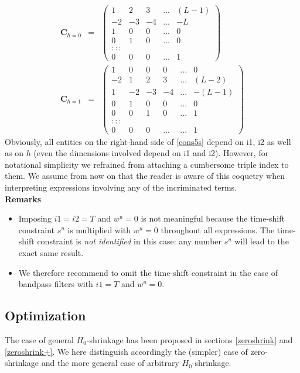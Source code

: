 \documentclass[11pt]{article}
\begin{document}
\begin{eqnarray*}%
\mathbf{C}_{h=0}&=&\left(\begin{array}{ccccc}
1&2&3&...&(L-1)\\
-2&-3&-4&...&-L\\
1&0&0&...&0\\
0&1&0&...&0\\
:::\\
0&0&0&...&1
\end{array}\right)\nonumber\\
\mathbf{C}_{h=1}&=&\left(\begin{array}{cccccc}
1&0&0&0&...&0\\
-2&1&2&3&...&(L-2)\\
1&-2&-3&-4&...&-(L-1)\\
0&1&0&0&...&0\\
0&0&1&0&...&1\\
:::\\
0&0&0&...&...&1
\end{array}\right)\nonumber
\end{eqnarray*}
Obviously, all entities on the right-hand side of \ref{cons5s} depend on i1, i2 as well as on $h$ (even the dimensions involved depend on i1 and i2). However, for notational simplicity we refrained from attaching a cumbersome triple index to them. We assume from now on that the reader is aware of this coquetry when interpreting expressions involving any of the incriminated terms. \\

\textbf{Remarks}
\begin{itemize}
\item Imposing $i1=i2=T$ and $w^u=0$ is not meaningful because the time-shift constraint $s^u$ is multiplied with $w^u=0$ throughout all expressions. The time-shift constraint is \emph{not identified} in this case: any number $s^u$ will lead to the exact same result. 
\item We therefore recommend to omit the time-shift 
constraint in the case of bandpass filters with $i1=T$ and $w^u=0$.
\end{itemize}



 
\subsection{Optimization}\label{optim_stat}

The case of general $H_0$-shrinkage has been proposed in sections \ref{zeroshrink} and \ref{zeroshrink+}. We here distinguish accordingly 
the (simpler) case of zero-shrinkage and the more general case of arbitrary $H_0$-shrinkage.
\end{document}
